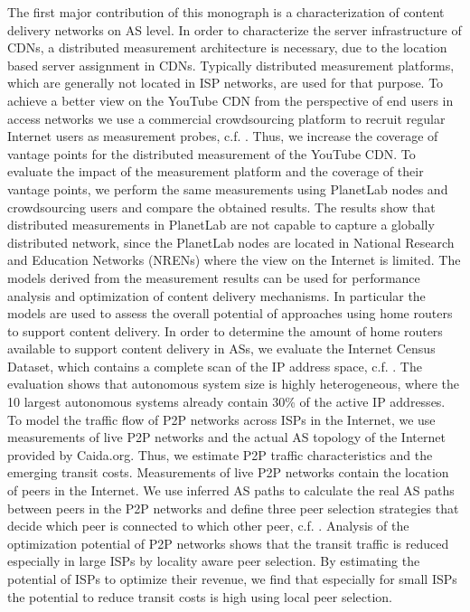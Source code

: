 The first major contribution of this monograph is a characterization of content delivery networks on AS level.
In order to characterize the server infrastructure of CDNs, a distributed measurement architecture is necessary, due to the location based server assignment in CDNs.
Typically distributed measurement platforms, which are generally not located in ISP networks, are used for that purpose.
To achieve a better view on the YouTube CDN from the perspective of end users in access networks we use a commercial crowdsourcing platform to recruit regular Internet users as measurement probes, c.f. \cite{burger2014vantage}.
Thus, we increase the coverage of vantage points for the distributed measurement of the YouTube CDN.
To evaluate the impact of the measurement platform and the coverage of their vantage points, we perform the same measurements using PlanetLab nodes and crowdsourcing users and compare the obtained results.
The results show that distributed measurements in PlanetLab are not capable to capture a globally distributed network, since the PlanetLab nodes are
located in National Research and Education Networks (NRENs) where the view on the Internet is limited.
The models derived from the measurement results can be used for performance analysis and optimization of content delivery mechanisms.
In particular the models are used to assess the overall potential of approaches using home routers to support content delivery.
In order to determine the amount of home routers available to support content delivery in ASs, we evaluate the Internet Census Dataset, which contains a complete scan of the IP address space, c.f. \cite{burger2016hierarchical}.
The evaluation shows that autonomous system size is highly heterogeneous, where the 10 largest autonomous systems already contain 30\% of the active IP addresses.
To model the traffic flow of P2P networks across ISPs in the Internet, we use measurements of live P2P networks and the actual AS topology of the Internet provided by Caida.org.
Thus, we estimate P2P traffic characteristics and the emerging transit costs.
Measurements of live P2P networks contain the location of peers in the Internet.
We use inferred AS paths to calculate the real AS paths between peers in the P2P networks and define three peer selection strategies that decide which peer is connected to which other peer, c.f. \cite{burger2012profit}.
Analysis of the optimization potential of P2P networks shows that the transit traffic is reduced especially in large ISPs by locality aware peer selection.
By estimating the potential of ISPs to optimize their revenue, we find that especially for small ISPs the potential to reduce transit costs is high using local peer selection.

